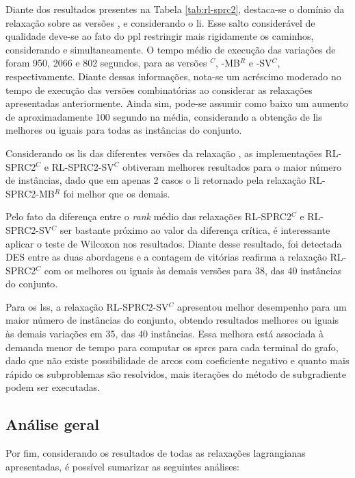 Diante  dos  resultados presentes  na  Tabela  \ref{tab:rl-sprc2}, destaca-se  o
domínio da relaxação {\rlq} sobre as  versões {\rlu, \rld} e {\rlt} considerando
o \gls{li}.  Esse salto considerável de  qualidade deve-se ao fato  do \gls{ppl}
restringir  mais  rigidamente os  caminhos,  considerando  {\delay} e  {\jitter}
simultaneamente. O  tempo médio de execução  das variações de {\rlq}  foram 950,
2066 e 802 segundos, para  as versões {\rlq}$^C$, {\rlq}-MB$^R$ e {\rlq}-SV$^C$,
respectivamente.  Diante dessas  informações, nota-se  um acréscimo  moderado no
tempo  de  execução  das  versões  combinatórias  ao  considerar  as  relaxações
apresentadas anteriormente. Ainda sim, pode-se  assumir como baixo um aumento de
aproximadamente  100 segundo  na  média, considerando  a  obtenção de  \gls{li}s
melhores ou iguais para todas as instâncias do conjunto.

Considerando  os  \gls{li}s  das  diferentes versões  da  relaxação  {\rlq},  as
implementações RL-SPRC2$^C$ e RL-SPRC2-SV$^C$ obtiveram melhores resultados para
o maior número  de instâncias, dado que  em apenas 2 casos  o \gls{li} retornado
pela relaxação RL-SPRC2-MB$^R$ foi melhor que os demais.

Pelo fato  da diferença entre o  {\em rank} médio das  relaxações RL-SPRC2$^C$ e
RL-SPRC2-SV$^C$  ser  bastante   próximo  ao  valor  da   diferença  crítica,  é
interessante aplicar o teste de Wilcoxon nos resultados. Diante desse resultado,
foi detectada DES entre  as duas abordagens e a contagem  de vitórias reafirma a
relaxação RL-SPRC2$^C$ com os melhores ou  iguais às demais versões para 38, das
40 instâncias do conjunto.

Para os \gls{ls}s, a relaxação RL-SPRC2-SV$^C$ apresentou melhor desempenho para
um maior número de instâncias do conjunto, obtendo resultados melhores ou iguais
às demais  variações em  35, das  40 instâncias. Essa  melhora está  associada à
demanda menor de tempo para computar os \gls{sprc}s para cada terminal do grafo,
dado que  não existe possibilidade  de arcos  com coeficiente negativo  e quanto
mais  rápido  os  subproblemas  são  resolvidos, mais  iterações  do  método  de
subgradiente podem ser executadas.

\subsection{Análise geral}

Por  fim,  considerando  os  resultados  de  todas  as  relaxações  lagrangianas
apresentadas, é possível sumarizar as seguintes análises:

